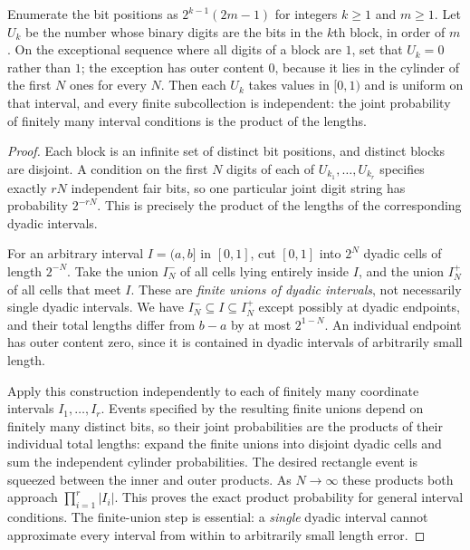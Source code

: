 \begin{proposition}\label{prop:manyuniforms}
Enumerate the bit positions as $2^{k-1}(2m-1)$ for integers $k\ge1$ and $m\ge1$. Let $U_k$ be the number whose binary digits are the bits in the $k$th block, in order of $m$. On the exceptional sequence where all digits of a block are $1$, set that $U_k=0$ rather than $1$; the exception has outer content $0$, because it lies in the cylinder of the first $N$ ones for every $N$. Then each $U_k$ takes values in $[0,1)$ and is uniform on that interval, and every finite subcollection is independent: the joint probability of finitely many interval conditions is the product of the lengths.
\end{proposition}
\begin{proof}
Each block is an infinite set of distinct bit positions, and distinct blocks are disjoint. A condition on the first $N$ digits of each of $U_{k_1},\ldots,U_{k_r}$ specifies exactly $rN$ independent fair bits, so one particular joint digit string has probability $2^{-rN}$. This is precisely the product of the lengths of the corresponding dyadic intervals.

For an arbitrary interval $I=(a,b]$ in $[0,1]$, cut $[0,1]$ into $2^N$ dyadic cells of length $2^{-N}$. Take the union $I_N^-$ of all cells lying entirely inside $I$, and the union $I_N^+$ of all cells that meet $I$. These are \emph{finite unions of dyadic intervals}, not necessarily single dyadic intervals. We have $I_N^-\subseteq I\subseteq I_N^+$ except possibly at dyadic endpoints, and their total lengths differ from $b-a$ by at most $2^{1-N}$. An individual endpoint has outer content zero, since it is contained in dyadic intervals of arbitrarily small length.

Apply this construction independently to each of finitely many coordinate intervals $I_1,\ldots,I_r$. Events specified by the resulting finite unions depend on finitely many distinct bits, so their joint probabilities are the products of their individual total lengths: expand the finite unions into disjoint dyadic cells and sum the independent cylinder probabilities. The desired rectangle event is squeezed between the inner and outer products. As $N\to\infty$ these products both approach $\prod_{i=1}^r |I_i|$. This proves the exact product probability for general interval conditions. The finite-union step is essential: a \emph{single} dyadic interval cannot approximate every interval from within to arbitrarily small length error.
\end{proof}

